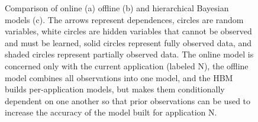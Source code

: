 {\begin{figure}
  \caption{ Comparison of online (a) offline (b) and hierarchical
    Bayesian models (c).  The arrows represent dependences, circles
    are random variables, white circles are hidden variables that
    cannot be observed and must be learned, solid circles represent
    fully observed data, and shaded circles represent partially
    observed data.  The online model is concerned only with the
    current application (labeled N), the offline model combines all
    observations into one model, and the HBM builds per-application
    models, but makes them conditionally dependent on one another so
    that prior observations can be used to increase the accuracy of
    the model built for application N.}
\label{fig:learning-models}
\end{figure}
}

